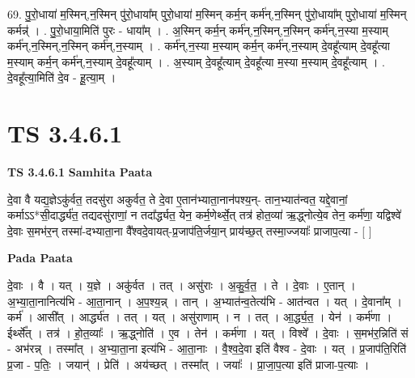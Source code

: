 \documentclass[17pt]{extarticle}
\begin{document}
69. पु॒रो॒धाया॑ म॒स्मिन्,न॒स्मिन् पु॑रो॒धाया᳚म् पुरो॒धाया॑ म॒स्मिन् कर्म॒न् कर्म॑न्,न॒स्मिन् पु॑रो॒धाया᳚म् पुरो॒धाया॑ म॒स्मिन् कर्मन्न्॑ । . पु॒रो॒धाया॒मिति॑ पुरः - धाया᳚म् । . अ॒स्मिन् कर्म॒न् कर्म॑न्,न॒स्मिन्,न॒स्मिन् कर्म॑न्,न॒स्या म॒स्याम् कर्म॑न्,न॒स्मिन्,न॒स्मिन् कर्म॑न्,न॒स्याम् । . कर्म॑न्,न॒स्या म॒स्याम् कर्म॒न् कर्म॑न्,न॒स्याम् दे॒वहू᳚त्याम् दे॒वहू᳚त्या म॒स्याम् कर्म॒न् कर्म॑न्,न॒स्याम् दे॒वहू᳚त्याम् । . अ॒स्याम् दे॒वहू᳚त्याम् दे॒वहू᳚त्या म॒स्या म॒स्याम् दे॒वहू᳚त्याम् । . दे॒वहू᳚त्या॒मिति॑ दे॒व - हू॒त्या॒म् । \newline
\pagebreak
{}

\section{ TS 3.4.6.1 }

\textbf{TS 3.4.6.1 } \newline
\textbf{Samhita Paata} \newline

दे॒वा वै यद्य॒ज्ञेऽकु॑र्वत॒ तदसु॑रा अकुर्वत॒ ते दे॒वा ए॒तान॑भ्याता॒नान॑पश्य॒न्- तान॒भ्यात॑न्वत॒ यद्दे॒वानां॒ कर्माऽऽ*सी॒दार्द्ध्य॑त॒ तद्यदसु॑राणां॒ न तदा᳚र्द्ध्यत॒ येन॒ कर्म॒णेर्थ्से॒त् तत्र॑ होत॒व्या॑ ऋ॒द्ध्नोत्ये॒व तेन॒ कर्म॑णा॒ यद्विश्वे॑ दे॒वाः स॒मभ॑र॒न् तस्मा॑-दभ्याता॒ना वै᳚श्वदे॒वायत्-प्र॒जाप॑ति॒र्जया॒न् प्राय॑च्छ॒त् तस्मा॒ज्जयाः᳚ प्राजाप॒त्या - [  ] \newline

\textbf{Pada Paata} \newline

दे॒वाः । वै । यत् । य॒ज्ञे । अकु॑र्वत । तत् । असु॑राः । अ॒कु॒र्व॒त॒ । ते । दे॒वाः । ए॒तान् । अ॒भ्या॒ता॒नानित्य॑भि - आ॒ता॒नान् । अ॒प॒श्य॒न्न् । तान् । अ॒भ्यात॑न्व॒तेत्य॑भि - आत॑न्वत । यत् । दे॒वाना᳚म् । कर्म॑ । आसी᳚त् । आर्द्ध्य॑त । तत् । यत् । असु॑राणाम् । न । तत् । आ॒र्द्ध्य॒त॒ । येन॑ । कर्म॑णा । ईर्थ्से᳚त् । तत्र॑ । हो॒त॒व्याः᳚ । ऋ॒द्ध्नोति॑ । ए॒व । तेन॑ । कर्म॑णा । यत् । विश्वे᳚ । दे॒वाः । स॒मभ॑र॒न्निति॑ सं - अभ॑रन्न् । तस्मा᳚त् । अ॒भ्या॒ता॒ना इत्य॑भि - आ॒ता॒नाः । वै॒श्व॒दे॒वा इति॑ वैश्व - दे॒वाः । यत् । प्र॒जाप॑ति॒रिति॑ प्र॒जा - प॒तिः॒ । जयान्॑ । प्रेति॑ । अय॑च्छत् । तस्मा᳚त् । जयाः᳚ । प्रा॒जा॒प॒त्या इति॑ प्राजा-प॒त्याः ।  \newline
\end{document}
